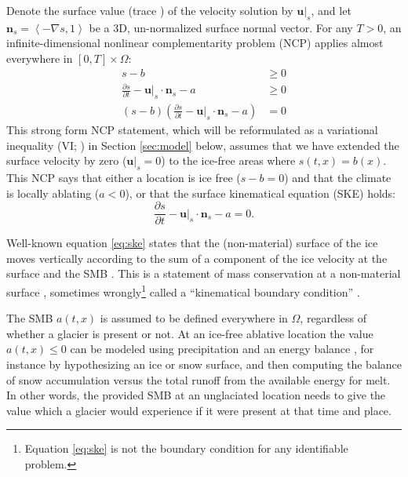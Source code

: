 \documentclass[hidelinks,onefignum,onetabnum,final]{siamart220329}  %
\newcommand{\grad}{\nabla}
\newcommand{\bn}{\mathbf{n}}
\newcommand{\bu}{\mathbf{u}}
\begin{document}
Denote the surface value (trace \cite{Evans2010}) of the velocity solution by $\bu|_s$, and let $\bn_s = \left<-\grad s,1\right>$ be a 3D, un-normalized surface normal vector.  For any $T>0$, an infinite-dimensional nonlinear complementarity problem (NCP) \cite{Bueler2021conservation,FacchineiPang2003,SchoofHewitt2013} applies almost everywhere in $[0,T]\times \Omega$:
\begin{subequations}
\label{eq:ncp}
\begin{align}
s - b &\ge 0 \\
\frac{\partial s}{\partial t} - \bu|_s \cdot \bn_s - a &\ge 0 \\
(s - b) \left(\frac{\partial s}{\partial t} - \bu|_s \cdot \bn_s - a\right) &= 0
\end{align}
\end{subequations}
This strong form NCP statement, which will be reformulated as a variational inequality (VI; \cite{KinderlehrerStampacchia1980}) in Section \ref{sec:model} below, assumes that we have extended the surface velocity by zero ($\bu|_s=0$) to the ice-free areas where $s(t,x)=b(x)$.  This NCP says that either a location is ice free ($s-b=0$) and that the climate is locally ablating ($a<0$), or that the surface kinematical equation (SKE) holds:
\begin{equation}
\frac{\partial s}{\partial t} - \bu|_s \cdot \bn_s - a = 0.  \label{eq:ske}
\end{equation}

Well-known equation \eqref{eq:ske} states that the (non-material) surface of the ice moves vertically according to the sum of a component of the ice velocity at the surface and the SMB \cite{SchoofHewitt2013}.  This is a statement of mass conservation at a non-material surface \cite{Aschwandenetal2012}, sometimes wrongly\footnote{Equation \eqref{eq:ske} is not the boundary condition for any identifiable problem.} called a ``kinematical boundary condition'' \cite{GreveBlatter2009}.

The SMB $a(t,x)$ is assumed to be defined everywhere in $\Omega$, regardless of whether a glacier is present or not.  At an ice-free ablative location the value $a(t,x)\le 0$ can be modeled using precipitation and an energy balance \cite{GreveBlatter2009}, for instance by hypothesizing an ice or snow surface, and then computing the balance of snow accumulation versus the total runoff from the available energy for melt.  In other words, the provided SMB at an unglaciated location needs to give the value which a glacier would experience if it were present at that time and place.
\end{document}
